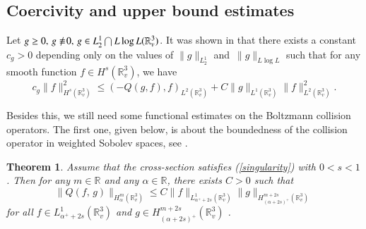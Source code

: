 \documentclass{amsart}[12pt, article]
\newtheorem{theo}{Theorem}[section]
\begin{document}
\subsection{Coercivity and upper bound estimates }\label{section2.1}
\setcounter{equation}{0}

Let $g\geq 0, \, g \equiv \hspace{-3mm} / \: 0, \, g\in L^1_2\bigcap
L\log L ({{{\mathbb R}}}^3_v)$. It was shown in \cite{al-1} that there exists a constant $c_g>0$ depending
only on the values of $\|g\|_{L^1_2}$ and $\,\|g\|_{L\log L}$ such
that for any smooth function $f\in H^{s}({{{\mathbb R}}}^3_v)$, we have
\begin{equation}\label{2.1.1}
c_{g}\| f\|^2_{H^s({{{\mathbb R}}}^3_v)} \leq (-Q(g, f),
 f)_{L^2({{{\mathbb R}}}^3_v)}+C \| g\|_{L^1({{{\mathbb R}}}^3_v)}\|f\|^2_{L^2({{{\mathbb R}}}^3_v)}.
\end{equation}

Besides this, we still need some functional estimates on the Boltzmann collision
operators. The first one, given below, is
 about the boundedness of the collision operator in
weighted Sobolev spaces, see  \cite{alex-lin,alex-2,alex-sing,alex-review,amuxy-nonlinear-3,HMUY} .

\begin{theo}\label{theo2.1}
Assume that the cross-section satisfies (\ref{singularity}) with
$0<s<1$ . Then for any $m\in{{{\mathbb R}}}$ and any $\alpha \in {{{\mathbb R}}}$, there
exists $C>0$ such that
\begin{equation}\label{2.1.2}
\|Q(f,\, g)\|_{H^{m}_{\alpha}({{{\mathbb R}}}^3_v)}\leq C\|f\|_{L^{1}_{{\alpha^+
+}2s}({{{\mathbb R}}}^3_v)} \| g\|_{H^{m+2s}_{({\alpha +} 2s)^+}({{{\mathbb R}}}^3_v)}\,
\end{equation}
for all $f\in L^{1}_{{\alpha^+ +}2s}({{{\mathbb R}}}^3_v)$ and $ g\in
H^{m+2s}_{({\alpha +} 2s)^+}({{{\mathbb R}}}^3_v)$ .
\end{theo}
\end{document}
